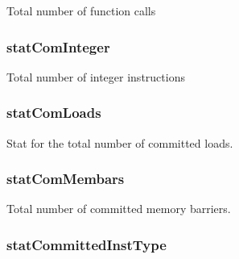 \label{classDefaultCommit_acd1aba8c2f19771552212e9c2917ac6b}
Total number of function calls \hypertarget{classDefaultCommit_ae562968e75d903bd12352af65cc558b6}{
\subsubsection[{statComInteger}]{ {\bf statComInteger}}}
\label{classDefaultCommit_ae562968e75d903bd12352af65cc558b6}
Total number of integer instructions \hypertarget{classDefaultCommit_a91927819864b9dc9d1ac706dc55d5dce}{
\subsubsection[{statComLoads}]{ {\bf statComLoads}}}
\label{classDefaultCommit_a91927819864b9dc9d1ac706dc55d5dce}
Stat for the total number of committed loads. \hypertarget{classDefaultCommit_a9b029ac182d54199247dfa90ed86d368}{
\subsubsection[{statComMembars}]{ {\bf statComMembars}}}
\label{classDefaultCommit_a9b029ac182d54199247dfa90ed86d368}
Total number of committed memory barriers. \hypertarget{classDefaultCommit_ad0d59ba553bc001d75aff706903e2f77}{
\subsubsection[{statCommittedInstType}]{ {\bf statCommittedInstType}}}
